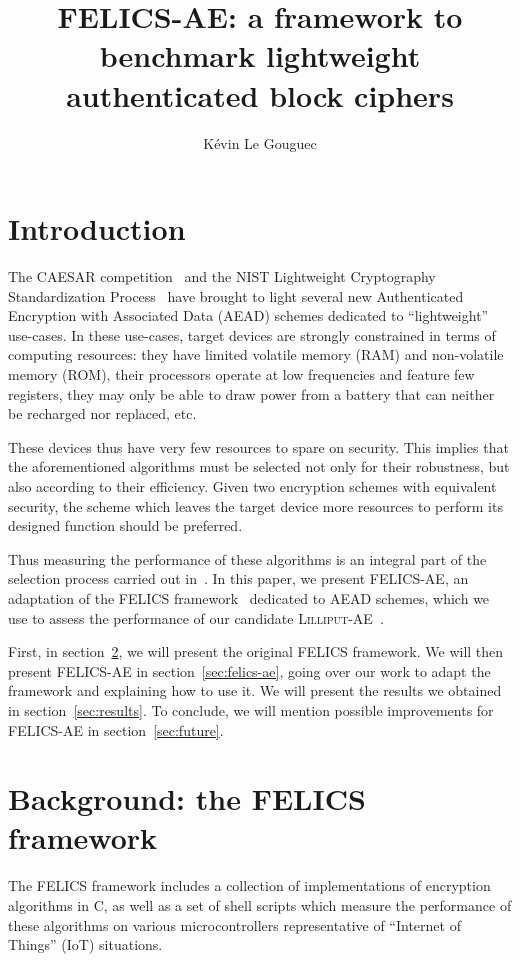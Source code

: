 \documentclass{article}
\title{
  FELICS-AE: a framework to benchmark lightweight authenticated block ciphers
}
\author[*]{Kévin Le Gouguec}
\affil[*]{
  Airbus CyberSecurity -
  ZA Clef Saint-Pierre,
  1 Bd Jean Moulin,
  CS 40001,
  MetaPole,
  78996 ÉLANCOURT Cedex -
  France -
  \href{mailto:kevin.legouguec@airbus.com}{kevin.legouguec@airbus.com}
}
\begin{document}
\maketitle

\section{Introduction}
\label{sec:intro}

The CAESAR competition~\cite{CAESAR:submissions} and the NIST
Lightweight Cryptography Standardization Process~\cite{NIST:LWC} have
brought to light several new Authenticated Encryption with Associated
Data (AEAD) schemes dedicated to ``lightweight'' use-cases.  In these
use-cases, target devices are strongly constrained in terms of
computing resources: they have limited volatile memory (RAM) and
non-volatile memory (ROM), their processors operate at low frequencies
and feature few registers, they may only be able to draw power from a
battery that can neither be recharged nor replaced, etc.

These devices thus have very few resources to spare on security.  This
implies that the aforementioned algorithms must be selected not only
for their robustness, but also according to their efficiency.  Given
two encryption schemes with equivalent security, the scheme which
leaves the target device more resources to perform its designed
function should be preferred.

Thus measuring the performance of these algorithms is an integral part
of the selection process carried out in~\cite{NIST:LWC}.  In this
paper, we present FELICS-AE, an adaptation of the FELICS
framework~\cite{FELICS:paper} dedicated to AEAD schemes, which we use
to assess the performance of our candidate
\textsc{Lilliput-AE}~\cite{NIST:Lilliput-AE}.

First, in section~\ref{sec:felics}, we will present the original
FELICS framework.  We will then present FELICS-AE in
section~\ref{sec:felics-ae}, going over our work to adapt the
framework and explaining how to use it.  We will present the results
we obtained in section~\ref{sec:results}.  To conclude, we will
mention possible improvements for FELICS-AE in
section~\ref{sec:future}.

\section{Background: the FELICS framework}
\label{sec:felics}

The FELICS framework\cite{FELICS:paper} includes a collection of
implementations of encryption algorithms in C, as well as a set of
shell scripts which measure the performance of these algorithms on
various microcontrollers representative of ``Internet of Things''
(IoT) situations.
\end{document}
